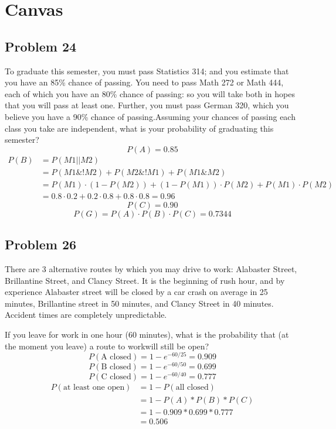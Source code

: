 \documentclass{article}
\begin{document}
\section*{Canvas}
\subsection*{Problem 24}
To graduate this semester, you must pass Statistics 314; and you estimate that you have an 85\% chance of passing. You need to pass Math 272 or Math 444, each of which you have an 80\% chance of passing: so you will take both in hopes that you will pass at least one. Further, you must pass German 320, which you believe you have a 90\% chance of passing.Assuming your chances of passing each class you take are independent, what is your probability of graduating this semester?
\begin{equation}
    P(A) = 0.85
\end{equation}
\begin{align}
    P(B)&= P(M1||M2)\\
    &= P(M1 \& !M2) + P(M2 \& !M1) + P(M1 \& M2)\\
    &= P(M1)\cdot(1- P(M2)) + (1- P(M1))\cdot P(M2) + P(M1)\cdot P(M2)\\
    &= 0.8\cdot0.2+ 0.2\cdot0.8+ 0.8\cdot0.8 = 0.96
\end{align}
\begin{equation}
    P(C) = 0.90
\end{equation}
\begin{equation}
    P(G) = P(A) \cdot P(B) \cdot P(C) = \boxed{0.7344}
\end{equation}
\subsection*{Problem 26}
There are 3 alternative routes by which you may drive to work: Alabaster Street, Brillantine Street, and Clancy Street. It is the beginning of rush hour, and by experience Alabaster street will be closed by a car crash on average in 25 minutes, Brillantine street in 50 minutes, and Clancy Street in 40 minutes. Accident times are completely unpredictable.

If you leave for work in one hour (60 minutes), what is the probability that (at the moment you leave) a route to workwill still be open?
\begin{equation}
P(\text{A closed}) = 1 - e^{-60/25} = 0.909
\end{equation}
\begin{equation}
P(\text{B closed}) = 1 - e^{-60/50} = 0.699
\end{equation}
\begin{equation}
P(\text{C closed}) = 1 - e^{-60/40} = 0.777
\end{equation}
\begin{align}
P(\text{at least one open}) &= 1 - P(\text{all closed})\\
&=1 - P(A) * P(B) * P(C)\\
&=1 - 0.909 * 0.699 * 0.777\\
&=\boxed{0.506}
\end{align}
\newpage
\end{document}
